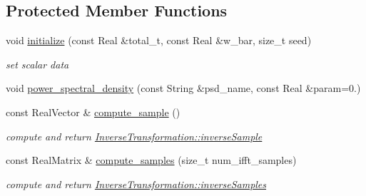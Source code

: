 \subsection*{Protected Member Functions}
\begin{DoxyCompactItemize}
\item 
void \hyperlink{classPecos_1_1FourierInverseTransformation_aff7310eaa8322a3eccf9815cc7da4a8e}{initialize} (const Real \&total\+\_\+t, const Real \&w\+\_\+bar, size\+\_\+t seed)\label{classPecos_1_1FourierInverseTransformation_aff7310eaa8322a3eccf9815cc7da4a8e}

\begin{DoxyCompactList}\small\item\em set scalar data \end{DoxyCompactList}\item 
void \hyperlink{classPecos_1_1FourierInverseTransformation_a2f54b6bae76157d4a964cd3ff73e4947}{power\+\_\+spectral\+\_\+density} (const String \&psd\+\_\+name, const Real \&param=0.)
\item 
const Real\+Vector \& \hyperlink{classPecos_1_1FourierInverseTransformation_a1e56233ae21533f04a96a94d7fa96786}{compute\+\_\+sample} ()\label{classPecos_1_1FourierInverseTransformation_a1e56233ae21533f04a96a94d7fa96786}

\begin{DoxyCompactList}\small\item\em compute and return \hyperlink{classPecos_1_1InverseTransformation_a17018c54acd67607b74c8783997d43a9}{Inverse\+Transformation\+::inverse\+Sample} \end{DoxyCompactList}\item 
const Real\+Matrix \& \hyperlink{classPecos_1_1FourierInverseTransformation_ac13e278177979d4ac4ae170a804e1ba7}{compute\+\_\+samples} (size\+\_\+t num\+\_\+ifft\+\_\+samples)\label{classPecos_1_1FourierInverseTransformation_ac13e278177979d4ac4ae170a804e1ba7}

\begin{DoxyCompactList}\small\item\em compute and return \hyperlink{classPecos_1_1InverseTransformation_ab9922b4f4d5024622225f70ea343f9ee}{Inverse\+Transformation\+::inverse\+Samples} \end{DoxyCompactList}\end{DoxyCompactItemize}
